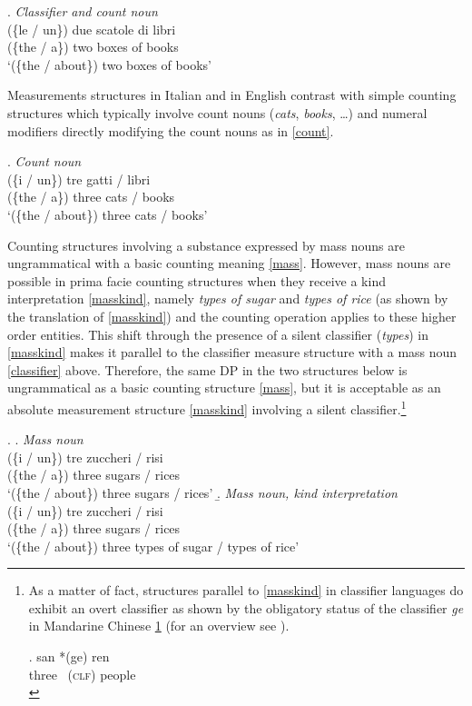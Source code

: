 \documentclass[charis, linguex]{glossa}
\begin{document}
\ex. \textit{Classifier and count noun} \\ 
	\gll (\{le / un\}) due scatole di libri \\ 
      (\{the / a\}) two boxes  of  books  \\ 
	  \glt  `(\{the / about\}) two boxes of books'  \label{classifiercount}	  	  

	  
Measurements structures in Italian and in English contrast with simple counting structures which typically involve count nouns (\textit{cats}, \textit{books}, \dots) and numeral modifiers directly modifying the count nouns as in \ref{count}. 

\ex. \textit{Count noun} \\ 
	\gll (\{i / un\}) tre gatti / libri \\ 
      (\{the / a\}) three cats / books  \\   
	  \glt  `(\{the / about\}) three cats / books' \label{count}	

	


   
Counting structures involving a substance expressed by mass nouns are ungrammatical with a basic counting meaning \ref{mass}. However, mass nouns are possible in prima facie counting structures when they receive a kind interpretation \ref{masskind}, namely \textit{types of sugar} and \textit{types of rice} (as shown by the translation of \ref{masskind}) and the counting operation applies to these higher order entities. This shift through the presence of a silent classifier (\textit{types}) in \ref{masskind} makes it parallel to the classifier measure structure with a mass noun \ref{classifier} above. Therefore, the same DP in the two structures below is ungrammatical as a basic counting structure \ref{mass}, but it is acceptable as an absolute measurement structure \ref{masskind} involving a silent classifier.\footnote{As a matter of fact, structures parallel to \ref{masskind} in classifier languages  do exhibit an overt classifier as shown by the obligatory status of the classifier \textit{ge} in Mandarine Chinese \ref{classifier1} (for an overview see \citealt[\S 5]{sco20} ).

\exg. san *(ge) ren \\ 
           three \ (\textsc{clf}) people \\ \label{classifier1}
		   
		   }
	  
\ex. \a. \textit{Mass noun} \\  
	\gll*(\{i / un\}) tre zuccheri / risi \\
      (\{the / a\}) three sugars / rices   \\  
	 \glt  `(\{the / about\}) three sugars / rices'   \label{mass}	
\b. \textit{Mass noun, kind interpretation} \\   
	 \gll (\{i / un\}) tre zuccheri / risi \\
      (\{the / a\}) three sugars / rices   \\  
	 \glt  `(\{the / about\}) three types of sugar / types of rice'  \label{masskind}	
\end{document}
